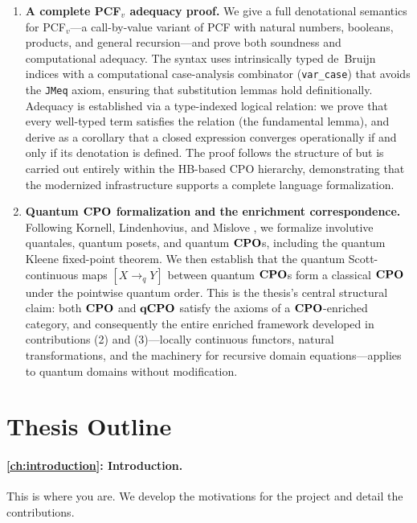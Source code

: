 \begin{enumerate}
\item \textbf{A complete PCF$_v$ adequacy proof.}
  We give a full denotational semantics for PCF$_v$---a call-by-value variant of PCF with natural 
  numbers, booleans, products, and general recursion---and prove both soundness and computational 
  adequacy. The syntax uses intrinsically typed de~Bruijn indices with a computational case-analysis 
  combinator (\texttt{var\_case}) that avoids the \texttt{JMeq} axiom, ensuring that substitution 
  lemmas hold definitionally. Adequacy is established via a type-indexed logical relation: we prove 
  that every well-typed term satisfies the relation (the fundamental lemma), and derive as a corollary 
  that a closed expression converges operationally if and only if its denotation is defined. 
  The proof follows the structure of \cite{BKV2009} but is carried out entirely within the 
  HB-based CPO hierarchy, demonstrating that the modernized infrastructure supports a 
  complete language formalization.

\item \textbf{Quantum $\mathbf{CPO}$ formalization and the enrichment correspondence.}
  Following Kornell, Lindenhovius, and Mislove \cite{KLM2024}, we formalize involutive quantales, 
  quantum posets, and quantum $\mathbf{CPO}$s, including the quantum Kleene fixed-point theorem. We then 
  establish that the quantum Scott-continuous maps $[X \to_{q} Y]$ between quantum $\mathbf{CPO}$s form a 
  classical $\mathbf{CPO}$ under the pointwise quantum order. This is the thesis's central structural claim: 
  both $\mathbf{CPO}$ and $\mathbf{qCPO}$ satisfy the axioms of a $\mathbf{CPO}$-enriched category, and consequently the 
  entire enriched framework developed in contributions (2) and (3)---locally continuous functors, 
  natural transformations, and the machinery for recursive domain equations---applies to quantum 
  domains without modification.

\end{enumerate}


\section{Thesis Outline}
\label{sec:intro-outline}

\paragraph{\cref{ch:introduction}: Introduction.}
This is where you are. We develop the motivations for the project and detail the contributions.

